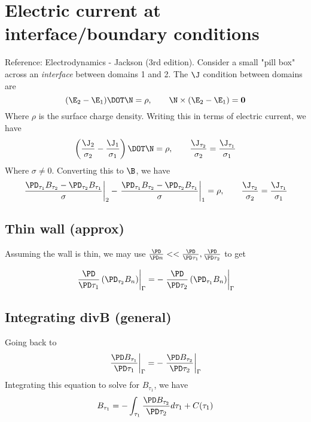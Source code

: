 \documentclass[11pt]{article}
\begin{document}
\section{Electric current at interface/boundary conditions}
Reference: Electrodynamics - Jackson (3rd edition). Consider a small "pill box" across an \textit{interface} between domains 1 and 2. The $\J$ condition between domains are
\begin{equation}
    (\E_2 - \E_1) \DOT \N = \rho
    , \qquad
    \N \times (\E_2 - \E_1) = \mathbf{0}
\end{equation}
Where $\rho$ is the surface charge density. Writing this in terms of electric current, we have
\begin{equation}
    \left( \frac{\J_2}{\sigma_2} - \frac{\J_1}{\sigma_1} \right) \DOT \N = \rho
    , \qquad
    \frac{\J_{\tau_2}}{\sigma_2} = \frac{\J_{\tau_1}}{\sigma_1}
\end{equation}
Where $\sigma \ne 0$.
Converting this to $\B$, we have
\begin{equation}
    \left.
    \frac{\PD_{\tau_1} B_{\tau_2} - \PD_{\tau_2} B_{\tau_1}}
    {\sigma}
    \right |_{2} -
    \left.
    \frac{\PD_{\tau_1} B_{\tau_2} - \PD_{\tau_2} B_{\tau_1}}
    {\sigma}
    \right |_{1}
    = \rho
    , \qquad
    \frac{\J_{\tau_2}}{\sigma_2} = \frac{\J_{\tau_1}}{\sigma_1}
\end{equation}


\subsection{Thin wall (approx)}
Assuming the wall is thin, we may use $\frac{\PD}{\PD n} << \frac{\PD}{\PD \tau_1},\frac{\PD}{\PD \tau_2}$ to get

\begin{equation}
  \left. \frac{\PD }{\PD \tau_1} \left(
  \PD_{\tau_2} B_{n}
  \right) \right|_{\Gamma} = -
  \left. \frac{\PD }{\PD \tau_2} \left(
  \PD_{\tau_1} B_{n}
  \right) \right|_{\Gamma}
\end{equation}

\subsection{Integrating divB (general)}
Going back to
\begin{equation}
  \left. \frac{\PD B_{\tau_1}}{\PD \tau_1} \right|_{\Gamma} = -
  \left. \frac{\PD B_{\tau_2}}{\PD \tau_2} \right|_{\Gamma}
\end{equation}
Integrating this equation to solve for $B_{\tau_1}$, we have
\begin{equation}
  B_{\tau_1} =
  -\int_{\tau_1} \frac{\PD B_{\tau_2}}{\PD \tau_2} d{\tau_1} + C(\tau_1)
\end{equation}
\end{document}
